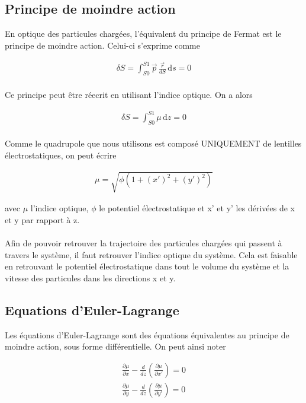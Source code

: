 \documentclass[a4paper]{article} %
\begin{document}
\subsection{Principe de moindre action}
En optique des particules chargées, l'équivalent du principe de Fermat est le principe de moindre action.
Celui-ci s'exprime comme 

\begin{equation}
\begin{aligned}
\delta S = \int_{S0}^{S1} \vec{p}\,\frac{\vec{r}}{dS} \, \mathrm{d}s = 0
\end{aligned}
\end{equation}
\\
Ce principe peut être réecrit en utilisant l'indice optique. On a alors 

\begin{equation}
\begin{aligned}
\delta S = \int_{S0}^{S1} \mu\,\mathrm{d}z = 0
\end{aligned}
\end{equation}
\\
Comme le quadrupole que nous utilisons est composé UNIQUEMENT de lentilles électrostatiques, on peut écrire

\begin{equation}
\begin{aligned}
\mu = \sqrt{\phi(1+(x')^2 + (y')^2)}
\end{aligned}
\end{equation}

avec $\mu$ l'indice optique, $\phi$ le potentiel électrostatique et x' et y' les dérivées de x et y par
rapport à z.
\\
\\
Afin de pouvoir retrouver la trajectoire des particules chargées qui passent à travers le système, il faut 
retrouver l'indice optique du système. Cela est faisable en retrouvant le potentiel électrostatique dans tout le volume du
système et la vitesse des particules dans les directions x et y. 

\subsection{Equations d'Euler-Lagrange}
Les équations d'Euler-Lagrange sont des équations équivalentes au principe de moindre action, sous forme 
différentielle. On peut ainsi noter 

\begin{equation}
\begin{aligned}
\frac{\partial \mu}{\partial x}-\frac{d}{dz}\left(\frac{\partial \mu}{\partial x'}\right)=0\\
\frac{\partial \mu}{\partial y}-\frac{d}{dz}\left(\frac{\partial \mu}{\partial y'}\right)=0
\end{aligned}
\end{equation}
\end{document}
